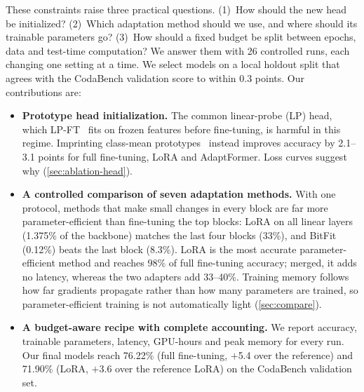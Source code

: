 These constraints raise three practical questions.
(1)~How should the new head be initialized?
(2)~Which adaptation method should we use, and where should its trainable parameters go?
(3)~How should a fixed budget be split between epochs, data and test-time computation?
We answer them with 26 controlled runs, each changing one setting at a time.
We select models on a local holdout split that agrees with the CodaBench validation score to within 0.3 points.
Our contributions are:
\begin{itemize}[leftmargin=*,itemsep=1pt,topsep=2pt]
    \item \textbf{Prototype head initialization.} The common linear-probe (LP) head, which LP-FT~\cite{kumar2022lpft} fits on frozen features before fine-tuning, is harmful in this regime. Imprinting class-mean prototypes~\cite{qi2018imprinted} instead improves accuracy by 2.1--3.1 points for full fine-tuning, LoRA and AdaptFormer. Loss curves suggest why (\cref{sec:ablation-head}).
    \item \textbf{A controlled comparison of seven adaptation methods.} With one protocol, methods that make small changes in every block are far more parameter-efficient than fine-tuning the top blocks: LoRA on all linear layers (1.375\% of the backbone) matches the last four blocks (33\%), and BitFit (0.12\%) beats the last block (8.3\%). LoRA is the most accurate parameter-efficient method and reaches 98\% of full fine-tuning accuracy; merged, it adds no latency, whereas the two adapters add 33--40\%. Training memory follows how far gradients propagate rather than how many parameters are trained, so parameter-efficient training is not automatically light (\cref{sec:compare}).
    \item \textbf{A budget-aware recipe with complete accounting.} We report accuracy, trainable parameters, latency, GPU-hours and peak memory for every run. Our final models reach 76.22\% (full fine-tuning, $+$5.4 over the reference) and 71.90\% (LoRA, $+$3.6 over the reference LoRA) on the CodaBench validation set.
\end{itemize}
